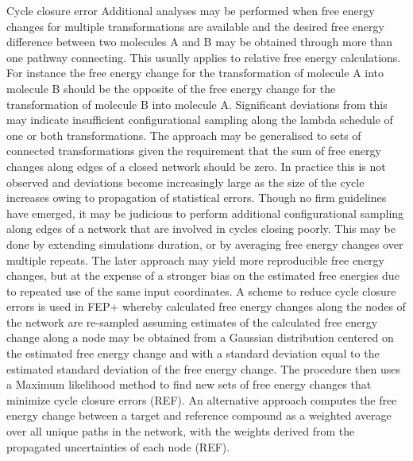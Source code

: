 \documentclass[9pt,bestpractices]{livecoms}
\begin{document}
\begin{enumerate}
Cycle closure error
Additional analyses may be performed when free energy changes for multiple transformations are available and the desired free energy difference between two molecules A and B may be obtained through more than one pathway connecting. This usually applies to relative free energy calculations. 
For instance the free energy change for the transformation of molecule A into molecule B should be the opposite of the free energy change for the transformation of molecule B into molecule A. Significant deviations from this may indicate insufficient configurational sampling along the lambda schedule of one or both transformations. The approach may be generalised to sets of connected transformations given the requirement that the sum of free energy changes along edges of a closed network should be zero. In practice this is not observed and deviations become increasingly large as the size of the cycle increases owing to propagation of statistical errors. Though no firm guidelines have emerged, it may be judicious to perform additional configurational sampling along edges of a network that are involved in cycles closing poorly. This may be done by extending simulations duration, or by averaging free energy changes over multiple repeats. The later approach may yield more reproducible free energy changes, but at the expense of a stronger bias on the estimated free energies due to repeated use of the same input coordinates. 
A scheme to reduce cycle closure errors is used in FEP+ whereby calculated free energy changes along the nodes of the network are re-sampled assuming estimates of the calculated free energy change along a node may be obtained from a Gaussian distribution centered on the estimated free energy change and with a standard deviation equal to the estimated standard deviation of the free energy change. The procedure then uses a Maximum likelihood method to find new sets of free energy changes that minimize cycle closure errors (REF). An alternative approach computes the free energy change between a target and reference compound as a weighted average over all unique paths in the network, with the weights derived from the propagated uncertainties of each node (REF). 


\end{enumerate}
\end{document}
